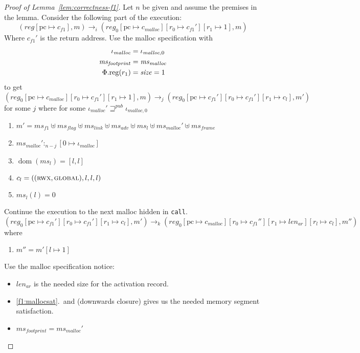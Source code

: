 \documentclass[a4paper]{article}
\newcommand{\update}[2]{[#1 \mapsto #2]}
\DeclareMathOperator{\dom}{dom}
\newcommand{\var}[1]{\mathit{#1}}
\newcommand{\hs}{\var{ms}}
\newcommand{\ms}{\hs}
\newcommand{\pcreg}{\mathrm{pc}}
\newcommand{\reg}{\var{reg}}
\newcommand{\heap}{\var{mem}}
\newcommand{\adv}{\var{adv}}
\newcommand{\flag}{\var{flag}}
\newcommand{\plainproj}[1]{\mathrm{#1}}
\newcommand{\memreg}[1][\Phi]{#1.\plainproj{reg}}
\newcommand{\futurewk}{\mathbin{\sqsupseteq}^{\var{pub}}}
\newcommand{\heapSat}[3][\heap]{#1 :_{#2} #3}
\newcommand{\codelabel}[1]{\mathit{#1}}
\newcommand{\malloc}{\codelabel{malloc}}
\newcommand{\plainperm}[1]{\textsc{#1}}
\newcommand{\rwx}{\plainperm{rwx}}
\newcommand{\glob}{\plainperm{global}}
\newcommand{\step}[1][]{\rightarrow_{#1}}
\begin{document}
\begin{proof}[Proof of Lemma~\ref{lem:correctness-f1}]
  Let $n$ be given and assume the premises in the lemma.  Consider the following part of the execution:
  \[
    (\reg\update{\pcreg}{c_{f1}},m) \step[i] (\reg_0\update{\pcreg}{c_\malloc}\update{r_0}{c_{f1}'}\update{r_1}{1},m)
  \]
  Where $c_{f1}'$ is the return address. Use the malloc specification with
  \begin{align*}
    \iota_\malloc &= \iota_{\malloc,0} \\
    \ms_{\var{footprint}} & = \ms_\malloc \\
    \memreg(r_1) & = \size = 1
  \end{align*}
  to get 
  \[
    (\reg_0\update{\pcreg}{c_\malloc}\update{r_0}{c_{f1}'}\update{r_1}{1},m) \step[j] (\reg_0\update{\pcreg}{c_{f1}'}\update{r_0}{c_{f1}'}\update{r_1}{c_l},m')
  \]
  for some $j$ where for some $\iota_{\malloc}' \futurewk \iota_{\malloc,0}$
  \begin{enumerate}
  \item $m' = \hs_{f1} \uplus 
    \hs_\flag \uplus                
    \ms_{\var{link}} \uplus 
    \hs_\adv \uplus 
    \ms_l \uplus
    \ms_{\malloc}' \uplus 
    \hs_{\var{frame}} $
  \item $\heapSat[\ms_{\malloc}']{n-j}{[0 \mapsto \iota_{\malloc}]}$ \label{f1:mallocsat}
  \item $\dom(\hs_l) = [l,l]$
  \item $c_l = ((\rwx,\glob),l,l,l)$ \label{test}
  \item $\ms_l(l) = 0$
  \end{enumerate}
  Continue the execution to the next malloc hidden in \texttt{call}.
  \[
    (\reg_0\update{\pcreg}{c_{f1}'}\update{r_0}{c_{f1}'}\update{r_1}{c_l},m')
    \step[k]
    (\reg_0\update{\pcreg}{c_\malloc}\update{r_0}{c_{f1}''}\update{r_1}{\var{len}_{\var{ar}}}\update{r_l}{c_l},m'')
  \]
  where
  \begin{enumerate}[resume]
  \item $m'' = m'[l\mapsto 1]$
  \end{enumerate}
  Use the malloc specification notice:
  \begin{itemize}
  \item $\var{len}_{\var{ar}}$ is the needed size for the activation record. 
  \item \ref{f1:mallocsat}.\ and (downwards closure) gives us the needed memory segment satisfaction.
  \item $\ms_{\var{footprint}} =  \ms_\malloc' $

\end{itemize}
\end{proof}
\end{document}
